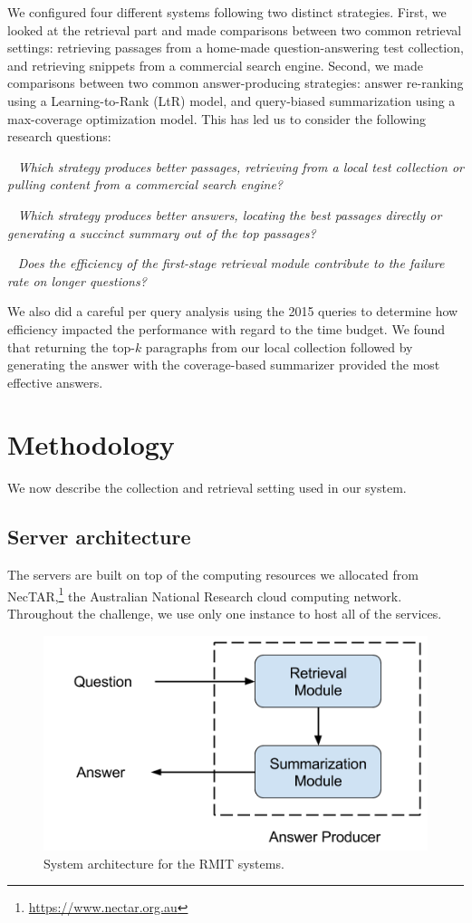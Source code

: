\documentclass[a4paper,10pt,conference,compsocconf,final]{IEEEtran}
\newcommand{\myparagraph}[1]{\vspace*{1ex}\noindent{\textbf{#1.}}~}
\begin{document}
We configured four different systems following two distinct
strategies.
First, we looked at the retrieval part and made comparisons between
two common retrieval settings: retrieving passages from a home-made
question-answering test collection, and retrieving snippets from a
commercial search engine.
Second, we made comparisons between two common answer-producing
strategies: answer re-ranking using a Learning-to-Rank (LtR) model,
and query-biased summarization using a max-coverage optimization
model.
This has led us to consider the following research questions: 

\myparagraph{RQ 1:}
{\emph{ 
Which strategy produces better passages, retrieving from a local test
collection or pulling content from a commercial search engine?
}} 

\myparagraph{RQ 2:}
{\emph{
Which strategy produces better answers, locating the best passages
directly or generating a succinct summary out of the top passages?
}} 

\myparagraph{RQ 3:}
{\emph{
Does the efficiency of the first-stage retrieval module contribute to
the failure rate on longer questions?
}} 

\medskip

We also did a careful per query analysis using the 2015 queries to
determine how efficiency impacted the performance with regard to the
time budget.
We found that returning the top-$k$ paragraphs from our local
collection followed by generating the answer with the coverage-based
summarizer provided the most effective answers.

\section{Methodology}
We now describe the collection and retrieval setting used in our
system. 

\subsection{Server architecture}

The servers are built on top of the computing resources we allocated
from NecTAR,\footnote{\url{https://www.nectar.org.au}} the Australian
National Research cloud computing network.
Throughout the challenge, we use only one instance to host all of the
services.

\begin{figure}[t]
  \centering
  \includegraphics[width=0.8\columnwidth]{arch.png}
  \caption{System architecture for the RMIT systems.}
  \label{fig:arch}
\end{figure}
\end{document}
